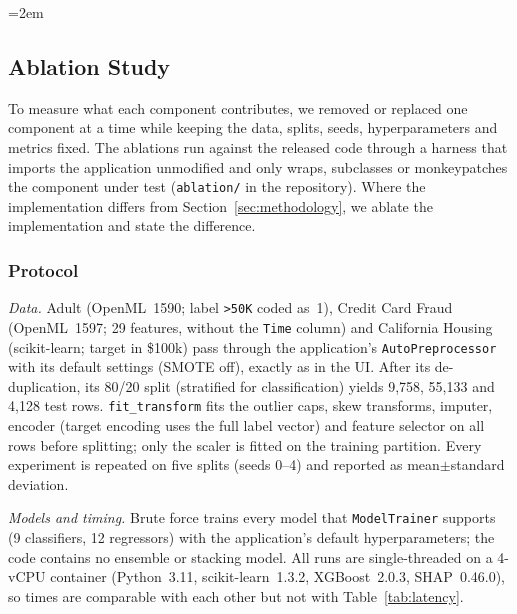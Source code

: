 \begingroup\emergencystretch=2em %
\subsection{Ablation Study}
\label{sec:ablation}

To measure what each component contributes, we removed or replaced one component at a time while keeping the data, splits, seeds, hyperparameters and metrics fixed. The ablations run against the released code through a harness that imports the application unmodified and only wraps, subclasses or monkeypatches the component under test (\texttt{ablation/} in the repository). Where the implementation differs from Section~\ref{sec:methodology}, we ablate the implementation and state the difference.

\subsubsection{Protocol}
\emph{Data.} Adult (OpenML~1590; label \texttt{>50K} coded as~1), Credit Card Fraud (OpenML~1597; 29 features, without the \texttt{Time} column) and California Housing (scikit-learn; target in \$100k) pass through the application's \texttt{AutoPreprocessor} with its default settings (SMOTE off), exactly as in the UI. After its de-duplication, its 80/20 split (stratified for classification) yields 9{,}758, 55{,}133 and 4{,}128 test rows. \texttt{fit\_transform} fits the outlier caps, skew transforms, imputer, encoder (target encoding uses the full label vector) and feature selector on all rows before splitting; only the scaler is fitted on the training partition. Every experiment is repeated on five splits (seeds 0--4) and reported as mean$\pm$standard deviation.

\emph{Models and timing.} Brute force trains every model that \texttt{ModelTrainer} supports (9 classifiers, 12 regressors) with the application's default hyperparameters; the code contains no ensemble or stacking model. All runs are single-threaded on a 4-vCPU container (Python~3.11, scikit-learn~1.3.2, XGBoost~2.0.3, SHAP~0.46.0), so times are comparable with each other but not with Table~\ref{tab:latency}.

